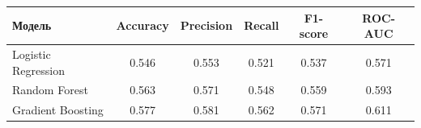 \begin{center}
\small
\begin{tabularx}{\textwidth}{|p{4.1cm}|c|c|c|c|c|}
\hline
\textbf{Модель} & \textbf{Accuracy} & \textbf{Precision} & \textbf{Recall} & \textbf{F1-score} & \textbf{ROC-AUC} \\
\hline
Logistic Regression & 0.546 & 0.553 & 0.521 & 0.537 & 0.571 \\
\hline
Random Forest & 0.563 & 0.571 & 0.548 & 0.559 & 0.593 \\
\hline
Gradient Boosting & 0.577 & 0.581 & 0.562 & 0.571 & 0.611 \\
\hline
\end{tabularx}
\end{center}
